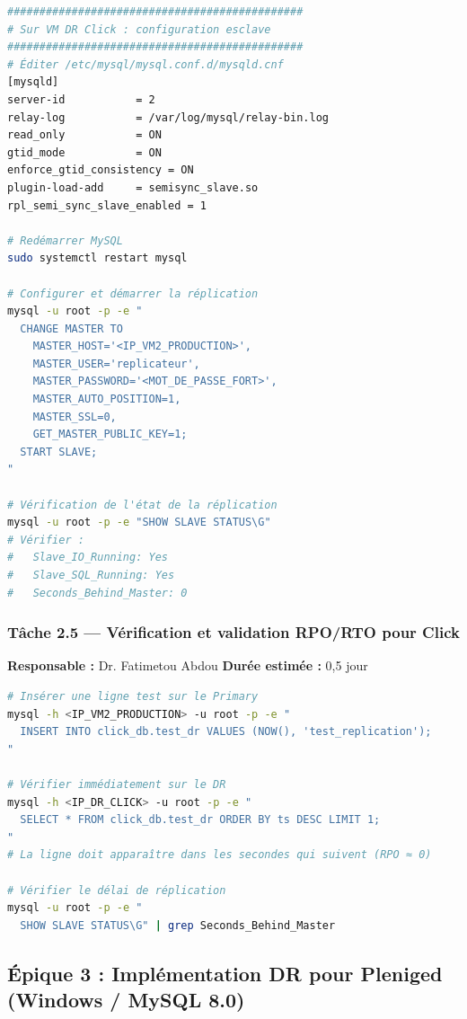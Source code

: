 \documentclass[a4paper,11pt]{article}
\begin{document}
\begin{lstlisting}[language=bash, caption={Configuration du serveur esclave (VM DR Click)}]
##############################################
# Sur VM DR Click : configuration esclave
##############################################
# Éditer /etc/mysql/mysql.conf.d/mysqld.cnf
[mysqld]
server-id           = 2
relay-log           = /var/log/mysql/relay-bin.log
read_only           = ON
gtid_mode           = ON
enforce_gtid_consistency = ON
plugin-load-add     = semisync_slave.so
rpl_semi_sync_slave_enabled = 1

# Redémarrer MySQL
sudo systemctl restart mysql

# Configurer et démarrer la réplication
mysql -u root -p -e "
  CHANGE MASTER TO
    MASTER_HOST='<IP_VM2_PRODUCTION>',
    MASTER_USER='replicateur',
    MASTER_PASSWORD='<MOT_DE_PASSE_FORT>',
    MASTER_AUTO_POSITION=1,
    MASTER_SSL=0,
    GET_MASTER_PUBLIC_KEY=1;
  START SLAVE;
"

# Vérification de l'état de la réplication
mysql -u root -p -e "SHOW SLAVE STATUS\G"
# Vérifier :
#   Slave_IO_Running: Yes
#   Slave_SQL_Running: Yes
#   Seconds_Behind_Master: 0
\end{lstlisting}

\subsubsection{Tâche 2.5 — Vérification et validation RPO/RTO pour Click}

\textbf{Responsable :} Dr. Fatimetou Abdou \quad \textbf{Durée estimée :} 0,5 jour

\begin{lstlisting}[language=bash, caption={Tests de validation de la réplication Click}]
# Insérer une ligne test sur le Primary
mysql -h <IP_VM2_PRODUCTION> -u root -p -e "
  INSERT INTO click_db.test_dr VALUES (NOW(), 'test_replication');
"

# Vérifier immédiatement sur le DR
mysql -h <IP_DR_CLICK> -u root -p -e "
  SELECT * FROM click_db.test_dr ORDER BY ts DESC LIMIT 1;
"
# La ligne doit apparaître dans les secondes qui suivent (RPO ≈ 0)

# Vérifier le délai de réplication
mysql -u root -p -e "
  SHOW SLAVE STATUS\G" | grep Seconds_Behind_Master
\end{lstlisting}

\subsection{Épique 3 : Implémentation DR pour Pleniged (Windows / MySQL 8.0)}
\end{document}
